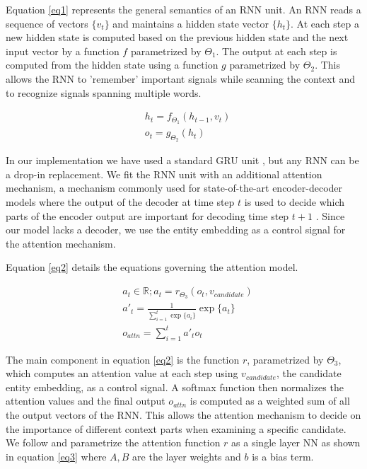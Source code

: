 \documentclass[11pt]{article}
\begin{document}
Equation \ref{eq1} represents the general semantics of an RNN unit. An RNN reads a sequence of vectors $\{v_t\}$ and maintains a hidden state vector $\{h_t\}$. At each step a new hidden state is computed based on the previous hidden state and the next input vector by a function $f$ parametrized by $\Theta_1$. The output at each step is computed from the hidden state using a function $g$ parametrized by $\Theta_2$. This allows the RNN to 'remember' important signals while scanning the context and to recognize signals spanning multiple words.

\begin{equation}
\label{eq1}
\begin{aligned}
& h_t=f_{\Theta_1}(h_{t-1}, v_t) \\
& o_t=g_{\Theta_2}(h_t)
\end{aligned}
\end{equation}

In our implementation we have used a standard GRU unit \cite{cho2014learning}, but any RNN can be a drop-in replacement. We fit the RNN unit with an additional attention mechanism, a mechanism commonly used for state-of-the-art encoder-decoder models where the output of the decoder at time step $t$ is used to decide which parts of the encoder output are important for decoding time step $t+1$ \cite{bahdanau2014neural, xu2015show}. Since our model lacks a decoder, we use the entity embedding as a control signal for the attention mechanism.

Equation \ref{eq2} details the equations governing the attention model.

\begin{equation}
\label{eq2}
\begin{aligned}
& a_t \in \mathbb{R}; a_t=r_{\Theta_3}(o_t, v_{candidate}) \\
& a'_t  = \frac{1}{\sum_{i=1}^{t} \exp\{a_i\}} \exp \{a_t\} \\
& o_{attn}=\sum_{i=1}^{t} a'_t o_t
\end{aligned}
\end{equation}

The main component in equation \ref{eq2} is the function $r$, parametrized by $\Theta_3$, which computes an attention value at each step using $v_{candidate}$, the candidate entity embedding, as a control signal. A softmax function then normalizes the attention values and the final output $o_{attn}$ is computed as a weighted sum of all the output vectors of the RNN. This allows the attention mechanism to decide on the importance of different context parts when examining a specific candidate. We follow  and parametrize the attention function $r$ as a single layer NN as shown in equation \ref{eq3} where $A, B$ are the layer weights and $b$ is a bias term.
\end{document}
